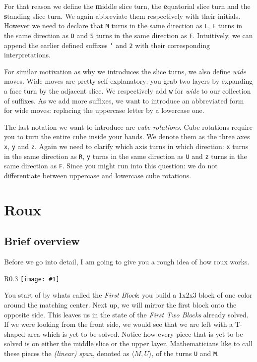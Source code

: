 \documentclass{scrreprt}
\newcommand{\wrapfig}[5] {
	\begin{wrapfigure}{#2}{#3\textwidth}
	\centering
	\texttt{[image: \#1]}
	\caption*{#5}
	\end{wrapfigure}
}
\begin{document}
For that reason we define the \textbf{m}iddle slice turn, the \textbf{e}quatorial slice turn and the \textbf{s}tanding slice turn. We again abbreviate them respectively with their initials. However we need to declare that \texttt{M} turns in the same direction as \texttt{L}, \texttt{E} turns in the same direction as \texttt{D} and \texttt{S} turns in the same direction as \texttt{F}. Intuitively, we can append the earlier defined suffixes \texttt{'} and \texttt{2} with their corresponding interpretations.\par

For similar motivation as why we introduces the slice turns, we also define \emph{wide} moves. Wide moves are pretty self-explanatory: you grab two layers by expanding a face turn by the adjacent slice. We respectively add \texttt{w} for \emph{wide} to our collection of suffixes. As we add more suffixes, we want to introduce an abbreviated form for wide moves: replacing the uppercase letter by a lowercase one.\par

The last notation we want to introduce are \emph{cube rotations}. Cube rotations require you to turn the entire cube inside your hands. We denote them as the three axes \texttt{x}, \texttt{y} and \texttt{z}. Again we need to clarify which axis turns in which direction: \texttt{x} turns in the same direction as \texttt{R}, \texttt{y} turns in the same direction as \texttt{U} and \texttt{z} turns in the same direction as \texttt{F}. Since you might run into this question: we do not differentiate between uppercase and lowercase cube rotations.


\chapter{Roux}

\section{Brief overview}

Before we go into detail, I am going to give you a rough idea of how roux works.\par

\wrapfig{f2b_transparent.png}{R}{0.3}{0.3}{The First Two Blocks}

You start of by whats called the \emph{First Block}: you build a 1x2x3 block of one color around the matching center. Next up, we will mirror the first block onto the opposite side. This leaves us in the state of the \emph{First Two Blocks} already solved. If we were looking from the front side, we would see that we are left with a T-shaped area which is yet to be solved. Notice how every piece that is yet to be solved is on either the middle slice or the upper layer. Mathematicians like to call these pieces the \emph{(linear) span}, denoted as $\langle M, U \rangle$, of the turns \texttt{U} and \texttt{M}.\par
\end{document}
